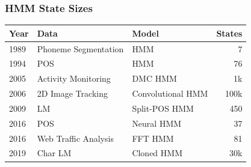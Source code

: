 \documentclass{beamer}
\begin{document}
\begin{frame}
\frametitle{HMM State Sizes}
\centering
\begin{tabular}{lllr}
\toprule
Year & Data & Model & States\\
\midrule
1989 & Phoneme Segmentation & HMM & 7\\
1994 & POS & HMM& 76\\
2005 & Activity Monitoring & DMC HMM& 1k\\
2006 & 2D Image Tracking & Convolutional HMM& 100k\\
2009 & LM & Split-POS HMM& 450\\
2016 & POS & Neural HMM& 37\\
2016 & Web Traffic Analysis & FFT HMM& 81\\
2019 & Char LM & Cloned HMM& 30k\\
\bottomrule
\end{tabular}
\end{frame}

\end{document}
